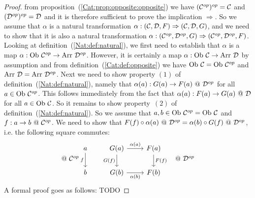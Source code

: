 \begin{proof}
    from proposition~(\ref{Cat:prop:opposite:opposite}) we have
    $(\mbox{${\cal C}^{op}$})^{op}=\mbox{$\cal C$}$ and $(\mbox{${\cal D}^{op}$})^{op}=\mbox{$\cal D$}$ and it is therefore sufficient 
    to prove the implication $\Rightarrow$. So we assume that $\alpha$ is 
    a natural transformation $\alpha:(\mbox{$\cal C$},\mbox{$\cal D$},F)\Rightarrow(\mbox{$\cal C$},\mbox{$\cal D$},G)$,
    and we need to show that it is also a natural transformation
    $\alpha:(\mbox{${\cal C}^{op}$},\mbox{${\cal D}^{op}$},G)\Rightarrow(\mbox{${\cal C}^{op}$},\mbox{${\cal D}^{op}$},F)$. Looking at 
    definition~(\ref{Nat:def:natural}), we first need to establish that
    $\alpha$ is a map $\alpha:\ob\ \Cop\to\arr\ \Dop$. However, it is 
    certainly a map $\alpha:\mbox{\rm Ob}\ \mbox{$\cal C$}\to\mbox{\rm Arr}\ \mbox{$\cal D$}$ by assumption and from 
    definition~(\ref{Cat:def:opposite}) we have $\mbox{\rm Ob}\ \mbox{$\cal C$}=\mbox{\rm Ob}\ \mbox{${\cal C}^{op}$}$ and
    $\mbox{\rm Arr}\ \mbox{$\cal D$}=\mbox{\rm Arr}\ \mbox{${\cal D}^{op}$}$. Next we need to show property $(1)$ of
    definition~(\ref{Nat:def:natural}), namely that 
    $\alpha(a):G(a)\to F(a)\ @\ \mbox{${\cal D}^{op}$}$ for all $a\in\mbox{\rm Ob}\ \mbox{${\cal C}^{op}$}$. This
    follows immediately from the fact that $\alpha(a):F(a)\to G(a)\ @\ \mbox{$\cal D$}$
    for all $a\in\mbox{\rm Ob}\ \mbox{$\cal C$}$. So it remains to show property~$(2)$ of 
    definition~(\ref{Nat:def:natural}). So we assume that $a,b\in\mbox{\rm Ob}\ \mbox{${\cal C}^{op}$}
    =\mbox{\rm Ob}\ \mbox{$\cal C$}$ and $f:a\to b\ @\ \Cop$. We need to show that 
    $F(f)\circ\alpha(a)\ @\ \Dop = \alpha(b)\circ G(f)\ @\ \Dop$, i.e.
    the following square commutes:
    \begin{eqnarray*}@\ \Cop
        &\begin{tikzcd}
            a\arrow[d,swap, "f"]
            &G(a)\arrow[r, "\alpha(a)"]\arrow[d, swap,"G(f)"]
            &F(a)\arrow[d, "F(f)"]
            \\
            b
            &G(b)\arrow[r, swap, "\alpha(b)"]
            &F(b)
        \end{tikzcd}&@\ \Dop
    \end{eqnarray*}
    A formal proof goes as follows: TODO
\end{proof}

